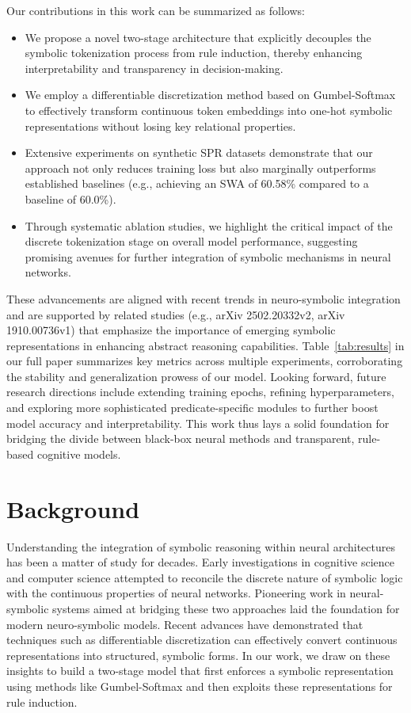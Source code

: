 \documentclass[11pt]{article}
\begin{document}
Our contributions in this work can be summarized as follows:
\begin{itemize}
    \item We propose a novel two-stage architecture that explicitly decouples the symbolic tokenization process from rule induction, thereby enhancing interpretability and transparency in decision-making.
    \item We employ a differentiable discretization method based on Gumbel-Softmax to effectively transform continuous token embeddings into one-hot symbolic representations without losing key relational properties.
    \item Extensive experiments on synthetic SPR datasets demonstrate that our approach not only reduces training loss but also marginally outperforms established baselines (e.g., achieving an SWA of 60.58\% compared to a baseline of 60.0\%).
    \item Through systematic ablation studies, we highlight the critical impact of the discrete tokenization stage on overall model performance, suggesting promising avenues for further integration of symbolic mechanisms in neural networks.
\end{itemize}

These advancements are aligned with recent trends in neuro-symbolic integration and are supported by related studies (e.g., arXiv 2502.20332v2, arXiv 1910.00736v1) that emphasize the importance of emerging symbolic representations in enhancing abstract reasoning capabilities. Table~\ref{tab:results} in our full paper summarizes key metrics across multiple experiments, corroborating the stability and generalization prowess of our model. Looking forward, future research directions include extending training epochs, refining hyperparameters, and exploring more sophisticated predicate-specific modules to further boost model accuracy and interpretability. This work thus lays a solid foundation for bridging the divide between black-box neural methods and transparent, rule-based cognitive models.

\section{Background}
Understanding the integration of symbolic reasoning within neural architectures has been a matter of study for decades. Early investigations in cognitive science and computer science attempted to reconcile the discrete nature of symbolic logic with the continuous properties of neural networks. Pioneering work in neural-symbolic systems aimed at bridging these two approaches laid the foundation for modern neuro-symbolic models. Recent advances have demonstrated that techniques such as differentiable discretization can effectively convert continuous representations into structured, symbolic forms. In our work, we draw on these insights to build a two-stage model that first enforces a symbolic representation using methods like Gumbel-Softmax and then exploits these representations for rule induction. 
\end{document}
